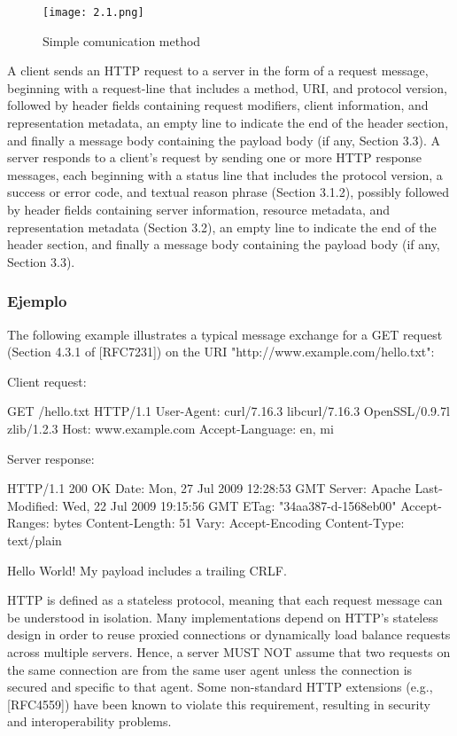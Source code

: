 \begin{center}
   \begin{figure}   
      \begin{center}
         \texttt{[image: 2.1.png]}
      \end{center}
      \caption{Simple comunication method}
   \end{figure}
\end{center}


A client sends an HTTP request to a server in the form of a request
message, beginning with a request-line that includes a method, URI,
and protocol version, followed by header fields
containing request modifiers, client information, and representation
metadata, an empty line to indicate the end of the
header section, and finally a message body containing the payload
body (if any, Section 3.3).
A server responds to a client's request by sending one or more HTTP
   response messages, each beginning with a status line that includes
   the protocol version, a success or error code, and textual reason
   phrase (Section 3.1.2), possibly followed by header fields containing
   server information, resource metadata, and representation metadata
   (Section 3.2), an empty line to indicate the end of the header
   section, and finally a message body containing the payload body (if
   any, Section 3.3).
\subsubsection*{Ejemplo}
The following example illustrates a typical message exchange for a
GET request (Section 4.3.1 of [RFC7231]) on the URI
"http://www.example.com/hello.txt":

Client request:

  GET /hello.txt HTTP/1.1
  User-Agent: curl/7.16.3 libcurl/7.16.3 OpenSSL/0.9.7l zlib/1.2.3
  Host: www.example.com
  Accept-Language: en, mi


Server response:

  HTTP/1.1 200 OK
  Date: Mon, 27 Jul 2009 12:28:53 GMT
  Server: Apache
  Last-Modified: Wed, 22 Jul 2009 19:15:56 GMT
  ETag: "34aa387-d-1568eb00"
  Accept-Ranges: bytes
  Content-Length: 51
  Vary: Accept-Encoding
  Content-Type: text/plain

  Hello World! My payload includes a trailing CRLF.

  HTTP is defined as a stateless protocol, meaning that each request
   message can be understood in isolation.  Many implementations depend
   on HTTP's stateless design in order to reuse proxied connections or
   dynamically load balance requests across multiple servers.  Hence, a
   server MUST NOT assume that two requests on the same connection are
   from the same user agent unless the connection is secured and
   specific to that agent.  Some non-standard HTTP extensions (e.g.,
   [RFC4559]) have been known to violate this requirement, resulting in
   security and interoperability problems.
